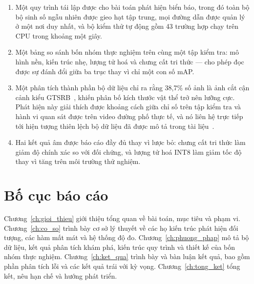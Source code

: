 \begin{enumerate}[leftmargin=1.5cm]
\item Một quy trình tái lập được cho bài toán phát hiện biển báo, trong đó toàn bộ bộ sinh số ngẫu
nhiên được gieo hạt tập trung, mọi đường dẫn được quản lý ở một nơi duy nhất, và bộ kiểm thử tự
động gồm 43 trường hợp chạy trên CPU trong khoảng một giây.

\item Một bảng so sánh bốn nhóm thực nghiệm trên cùng một tập kiểm tra: mô hình nền, kiến trúc
nhẹ, lượng tử hoá và chưng cất tri thức --- cho phép đọc được sự đánh đổi giữa ba trục thay vì chỉ
một con số mAP.

\item Một phân tích thành phần bộ dữ liệu chỉ ra rằng 38,7\% số ảnh là ảnh cắt cận cảnh kiểu
GTSRB~\cite{stallkamp2012gtsrb}, khiến phân bố kích thước vật thể trở nên lưỡng cực. Phát hiện này
giải thích được khoảng cách giữa chỉ số trên tập kiểm tra và hành vi quan sát được trên video
đường phố thực tế, và nó liên hệ trực tiếp tới hiện tượng thiên lệch bộ dữ liệu đã được mô tả
trong tài liệu~\cite{torralba2011bias}.

\item Hai kết quả âm được báo cáo đầy đủ thay vì lược bỏ: chưng cất tri thức làm giảm độ chính xác
so với đối chứng, và lượng tử hoá INT8 làm giảm tốc độ thay vì tăng trên môi trường thử nghiệm.
\end{enumerate}

\section{Bố cục báo cáo}

Chương~\ref{ch:gioi_thieu} giới thiệu tổng quan về bài toán, mục tiêu và phạm vi.
Chương~\ref{ch:co_so} trình bày cơ sở lý thuyết về các họ kiến trúc phát hiện đối tượng, các hàm
mất mát và hệ thống độ đo. Chương~\ref{ch:phuong_phap} mô tả bộ dữ liệu, kết quả phân tích khám
phá, kiến trúc quy trình và thiết kế của bốn nhóm thực nghiệm. Chương~\ref{ch:ket_qua} trình bày
và bàn luận kết quả, bao gồm phần phân tích lỗi và các kết quả trái với kỳ vọng.
Chương~\ref{ch:tong_ket} tổng kết, nêu hạn chế và hướng phát triển.
